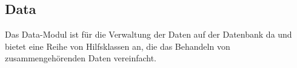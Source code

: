 \subsection{Data} \label{service:modul:Data}
Das Data-Modul ist für die Verwaltung der Daten auf der Datenbank da und bietet eine Reihe von Hilfsklassen an, die das Behandeln von zusammengehörenden Daten vereinfacht.